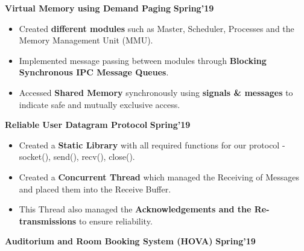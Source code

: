 \documentclass[10pt]{article}
\begin{document}
\spacedhrule{0.15ex}{1.0ex}
\large {\textbf{Virtual Memory using Demand Paging}} \normalsize  \href{https://github.com/shmundhra/Systems-Programming/tree/master/Demand_Paging} {\hspace{0.5ex}\faGithub} {\hfill} \textbf{Spring'19}\\[-1.75em]
\begin{itemize}
    \item Created \textbf{different modules} such as Master, Scheduler, Processes and the Memory Management Unit (MMU).\\[-1.9em]
    \item Implemented message passing between modules through     \textbf{Blocking Synchronous IPC Message Queues}.\\[-1.9em]
    \item Accessed \textbf{Shared Memory} synchronously using \textbf{signals \& messages} to indicate safe and mutually exclusive access.
    \\[-1em]
\end{itemize}
\vspace{-0.5ex}
\large {\textbf{Reliable User Datagram Protocol}} \normalsize  \href{https://github.com/shmundhra/Socket-Programming/tree/master/My\%20Reliable\%20UDP} {\hspace{0.5ex}\faGithub} {\hfill} \textbf{Spring'19}\\[-1.75em]
\begin{itemize}
    \item Created a \textbf{Static Library} with all required functions for our protocol - socket(), send(), recv(), close().\\[-1.9em]
    \item Created a \textbf{Concurrent Thread} which managed the Receiving of Messages and placed them into the Receive Buffer.\\[-1.9em]
    \item This Thread also managed the \textbf{Acknowledgements and the Re-transmissions} to ensure reliability.\\[-1em]
\end{itemize}
\vspace{-0.5ex}
\large {\textbf{Auditorium and Room Booking System (HOVA)}} \normalsize  \href{https://github.com/shmundhra/HOVA} {\hspace{0.5ex}\faGithub} {\hfill} \textbf{Spring'19}\\[-1.75em]
\end{document}
